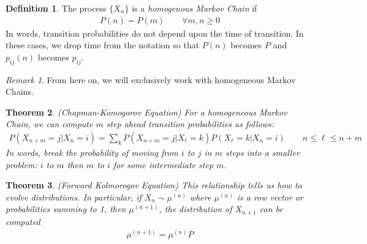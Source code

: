 \documentclass[12pt]{article}
\theoremstyle{plain}
\newtheorem{thm}{Theorem}[section]
\theoremstyle{definition}
\newtheorem{defn}[thm]{Definition}
\theoremstyle{remark}
\newtheorem*{rmk}{Remark}
\begin{document}
\begin{defn}
The process $\{X_n\}$ is a \emph{homogenous Markov Chain} if
\begin{align*}
  P(n) = P(m) \qquad \forall m,n\geq 0
\end{align*}
In words, transition probabilities do not depend upon the time of
transition. In these cases, we drop time from the notation so that
$P(n)$ becomes $P$ and $p_{ij}(n)$ becomes $p_{ij}$.
\end{defn}

\begin{rmk}
From here on, we will exclusively work with homogeneous Markov Chains.
\end{rmk}

\begin{thm}{\emph{(Chapman-Komogorov Equation)}}
For a homogeneous Markov Chain, we can compute $m$ step ahead transition
probabilities as follows:
\begin{align*}
  P(X_{n+m}=j | X_{n}=i) = \sum_k P(X_{n+m}=j| X_\ell=k)
    P(X_\ell = k| X_n=i)
  \qquad
  n \leq \ell \leq n+m
\end{align*}
In words, break the probability of moving from $i$ to $j$ in $m$ steps
into a smaller problem: $i$ to $m$ then $m$ to $i$ for some intermediate
step $m$.
\end{thm}

\begin{thm}{\emph{(Forward Kolmorogov Equation)}}
This relationship tells us how to evolve distributions. In particular,
if $X_n\sim \mu^{(n)}$ where $\mu^{(n)}$ is a row vector or
probabilities summing to 1, then $\mu^{(n+1)}$, the distribution of
$X_{n+1}$ can be computed
\begin{align*}
  \mu^{(n+1)} = \mu^{(n)} P
\end{align*}
\end{thm}
\end{document}
